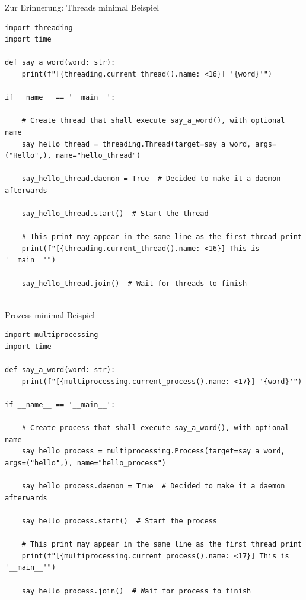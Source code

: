 \documentclass[12pt, aspectratio=169, usepdftitle=false, handout]{beamer}
\begin{document}
\begin{frame}[fragile]{Zur Erinnerung: Threads minimal Beispiel}
	\begin{lstlisting}[language=pytiny]
import threading
import time

def say_a_word(word: str):
    print(f"[{threading.current_thread().name: <16}] '{word}'")

if __name__ == '__main__':

    # Create thread that shall execute say_a_word(), with optional name
    say_hello_thread = threading.Thread(target=say_a_word, args=("Hello",), name="hello_thread")
    
    say_hello_thread.daemon = True  # Decided to make it a daemon afterwards

    say_hello_thread.start()  # Start the thread

    # This print may appear in the same line as the first thread print
    print(f"[{threading.current_thread().name: <16}] This is '__main__'")

    say_hello_thread.join()  # Wait for threads to finish
		
	\end{lstlisting}
\end{frame}


\begin{frame}[fragile]{Prozess minimal Beispiel}
	\begin{lstlisting}[language=pytiny]
import multiprocessing
import time

def say_a_word(word: str):
    print(f"[{multiprocessing.current_process().name: <17}] '{word}'")

if __name__ == '__main__':

    # Create process that shall execute say_a_word(), with optional name
    say_hello_process = multiprocessing.Process(target=say_a_word, args=("hello",), name="hello_process")
    
    say_hello_process.daemon = True  # Decided to make it a daemon afterwards

    say_hello_process.start()  # Start the process

    # This print may appear in the same line as the first thread print
    print(f"[{multiprocessing.current_process().name: <17}] This is '__main__'")

    say_hello_process.join()  # Wait for process to finish
		
	\end{lstlisting}
\end{frame}
\end{document}
